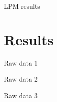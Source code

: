 \documentclass[aspectratio=169]{beamer}
\begin{document}
\begin{frame}{LPM results}
    \center
\end{frame}

\section{Results}
\begin{frame}{Raw data 1}
    \center
\end{frame}

\begin{frame}{Raw data 2}
    \center
\end{frame}

\begin{frame}{Raw data 3}
    \center
\end{frame}
\end{document}
